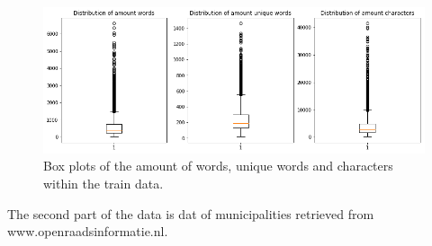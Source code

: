\begin{figure}[H]
	\centering
  	\includegraphics[width=.9\linewidth]{TrainAmountWords}
  	\caption{Box plots of the amount of words, unique words and characters within the train data.}
  	\label{fig:TrainAmount}
\end{figure}

The second part of the data is dat of municipalities retrieved from www.openraadsinformatie.nl.













%


